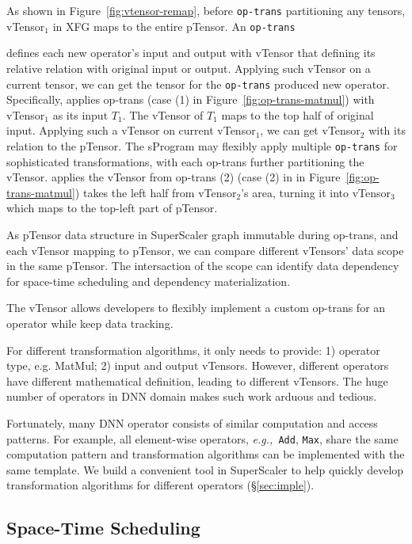 As shown in Figure~\ref{fig:vtensor-remap}, before \texttt{op-trans} partitioning any tensors, {vTensor$_{1}$} in XFG maps to the entire {pTensor}. An \texttt{op-trans} 

defines each new operator's input and output with {vTensor} that defining its relative relation with original input or output. Applying such {vTensor} on a current tensor, we can get the tensor for the \texttt{op-trans} produced new operator. Specifically,  applies op-trans (case (1) in Figure~\ref{fig:op-trans-matmul}) with {vTensor$_{1}$} as its input $T_{1}$. The {vTensor} of $T_{1}$ maps to the top half of original input. Applying such a vTensor on current {vTensor$_{1}$}, we can get {vTensor$_{2}$} with its relation to the {pTensor}. The {sProgram} may flexibly apply multiple \texttt{op-trans} for sophisticated transformations, with each op-trans further partitioning the vTensor.
 applies the vTensor from op-trans (2) (case (2) in in Figure~\ref{fig:op-trans-matmul}) takes the left half from {vTensor$_{2}$}'s area, turning it into {vTensor$_{3}$} which maps to the top-left part of {pTensor}.

As {pTensor} data structure in {SuperScaler} graph immutable during op-trans, and each vTensor mapping to {pTensor}, we can compare different vTensors' data scope in the same {pTensor}. The intersaction of the scope can identify data dependency for space-time scheduling and dependency materialization.

The vTensor allows developers to flexibly implement a custom op-trans for an operator while keep data tracking.

For different transformation algorithms, it only needs to provide: 1) operator type, e.g. MatMul; 2) input and output vTensors. However, different operators have different mathematical definition, leading to different vTensors. The huge number of operators in DNN domain makes such work arduous and tedious.

Fortunately, many DNN operator consists of similar computation and access patterns. For example, all element-wise operators, {\it e.g.,\ }\texttt{Add}, \texttt{Max}, share the same computation pattern and transformation algorithms can be implemented with the same template. We build a convenient tool in {SuperScaler} to help quickly develop transformation algorithms for different operators (\S \ref{sec:imple}).

\fi

\subsection{Space-Time Scheduling}
\label{subsec:model-sched}

